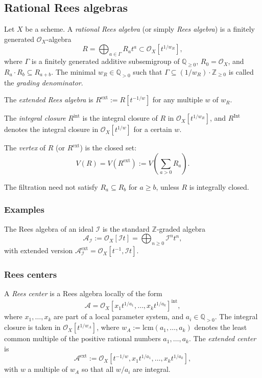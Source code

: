 \documentclass{amsart}
\newcommand{\QQ}{{\mathbb{Q}}}
\newcommand{\ZZ}{{\mathbb{Z}}}
\newcommand{\cA}{{\mathcal A}}
\newcommand{\cI}{{\mathcal I}}
\newcommand{\cO}{{\mathcal O}}
\newcommand{\Int}{{\operatorname{Int}}}
\newcommand{\ext}{{\operatorname{ext}}}
\newcommand{\inte}{{\operatorname{int}}}
\begin{document}
\subsection{Rational Rees algebras}

Let $X$ be a scheme. A \emph{rational Rees algebra} (or simply \emph{Rees algebra}) is a finitely generated $\cO_X$-algebra
\[
R = \bigoplus_{a \in \Gamma} R_a t^a \subset \cO_X[t^{1/w_R}],
\]
where $\Gamma$ is a finitely generated additive subsemigroup of $\QQ_{\geq 0}$, $R_0 = \cO_X$, and $R_a \cdot R_b \subseteq R_{a+b}$. The minimal $w_R \in \QQ_{>0}$ such that $\Gamma \subseteq (1/w_R)\cdot \ZZ_{\geq 0}$ is called the \emph{grading denominator}.

The \emph{extended Rees algebra} is $R^{\ext} := R[t^{-1/w}]$ for any multiple $w$ of $w_R$.

The \emph{integral closure} $R^\inte$ is the integral closure of $R$ in $\cO_X[t^{1/w_R}]$, and $R^\Int$ denotes the integral closure in $\cO_X[t^{1/w}]$ for a certain $w$.

The \emph{vertex} of $R$  (or $R^{\ext}$) is the closed set:
\[
V(R) = V(R^{\ext}):=V\left( \sum_{a > 0} R_a \right)  .
\]

\begin{remark}
The filtration need not satisfy $R_a \subseteq R_b$ for $a \geq b$, unless $R$ is integrally closed.
\end{remark}

\subsubsection{Examples}
The Rees algebra of an ideal $\cI$ is the standard $\ZZ$-graded algebra
\[
\cA_\cI := \cO_X[\cI t] = \bigoplus_{n \geq 0} \cI^n t^n,
\]
with extended version $\cA_\cI^{\ext} = \cO_X[t^{-1}, \cI t]$.


\subsubsection{Rees centers}
A \emph{Rees center} is a Rees algebra locally of the form
\[
\cA = \cO_X[x_1 t^{1/a_1}, \ldots, x_k t^{1/a_k}]^\inte,
\]
where $x_1,\ldots,x_k$ are part of a local parameter system, and $a_i \in \QQ_{>0}$. The integral closure is taken in \( \mathcal{O}_X[t^{1/w_A}] \), where \( w_A := \mathrm{lcm}(a_1, \ldots, a_k) \) denotes the least common multiple of the positive rational numbers \( a_1, \ldots, a_k \).
The \emph{extended center} is
\[
\cA^\ext := \cO_X[t^{-1/w}, x_1 t^{1/a_1}, \ldots, x_k t^{1/a_k}],
\]
with $w$ a multiple of $w_A$ so that all $w/a_i$ are integral.
\end{document}

